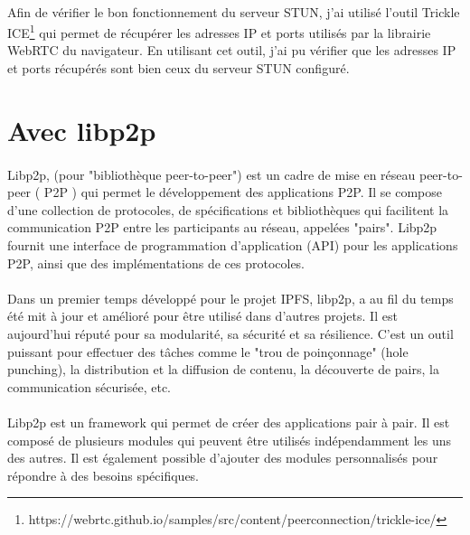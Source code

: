 \paragraph{}
Afin de vérifier le bon fonctionnement du serveur STUN, j'ai utilisé l'outil Trickle ICE\footnote{https://webrtc.github.io/samples/src/content/peerconnection/trickle-ice/} qui permet de récupérer les adresses IP et ports utilisés par la librairie WebRTC du navigateur.
En utilisant cet outil, j'ai pu vérifier que les adresses IP et ports récupérés sont bien ceux du serveur STUN configuré. 


\newpage
\section{Avec libp2p}

\paragraph{}
Libp2p, (pour "bibliothèque peer-to-peer") est un cadre de mise en réseau peer-to-peer ( P2P ) qui permet le développement des applications P2P. Il se compose d'une collection de protocoles, de spécifications et bibliothèques qui 
facilitent la communication P2P entre les participants au réseau, appelées "pairs". Libp2p fournit une interface de programmation d'application (API) pour les applications P2P, ainsi que des implémentations de ces protocoles.

\paragraph{}
Dans un premier temps développé pour le projet IPFS, libp2p, a au fil du temps été mit à jour et amélioré pour être utilisé dans d'autres projets. Il est aujourd'hui réputé pour sa modularité, sa sécurité et sa résilience. C'est un outil
puissant pour effectuer des tâches comme le "trou de poinçonnage" (hole punching), la distribution et la diffusion de contenu, la découverte de pairs, la communication sécurisée, etc. 

\paragraph{}
Libp2p est un framework qui permet de créer des applications pair à pair. Il est composé de plusieurs modules qui peuvent être utilisés indépendamment les uns des autres. Il est également possible d'ajouter des modules personnalisés
pour répondre à des besoins spécifiques. 


